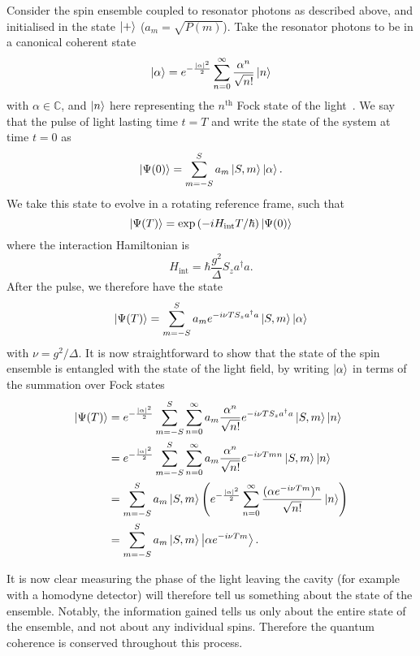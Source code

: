 Consider the spin ensemble coupled to resonator photons as described above, and
initialised in the state $\ket{+}$ ($a_m = \sqrt{P(m)}$). Take the resonator
photons to be in a canonical coherent state~\cite{Gazeau2009}
%
\begin{equation}
  \ket{\alpha} = e^{-\frac{|\alpha|^2}{2}}\sum_{n=0}^\infty \frac{\alpha^n}{\sqrt{n!}} \ket{n}
\end{equation}
%
with $\alpha\in\mathbb{C}$, and $\ket{n}$ here representing the $n^\text{th}$
Fock state of the light~\cite{agarwal2012}. We say that the pulse of light lasting time
$t=T$ and  write the state of the system at time $t=0$ as
%
\begin{equation}
  \ket{\Psi(0)} = \sum_{m=-S}^S a_m \ket{S, m}\ket{\alpha}.
\end{equation}
%
We take this state to evolve in a rotating reference frame, such that
%
\begin{equation}
  \ket{\Psi(T)} = \exp\left(-iH_\text{int}T/\hbar\right)\ket{\Psi(0)}
\end{equation}
%
where the interaction Hamiltonian is
%
\begin{equation}
  H_\text{int} = \hbar \frac{g^2}{\Delta} S_z a^\dagger a.
\end{equation}
%
After the pulse, we therefore have the state
%
\begin{equation}
  \ket{\Psi(T)} = \sum_{m=-S}^S a_m e^{-i\nu T S_z
  a^\dagger a} \ket{S, m}\ket{\alpha}
\end{equation}
%
with $\nu = g^2/\Delta$. It is now straightforward to show that
the state of the spin ensemble is entangled with the state of the light field,
by writing $\ket{\alpha}$ in terms of the summation over Fock states
%
\begin{align}
  \ket{\Psi(T)} &= e^{-\frac{|\alpha|^2}{2}}\sum_{m=-S}^S \sum_{n=0}^\infty a_m
   \frac{\alpha^n}{\sqrt{n!}} e^{-i\nu T S_z a^\dagger a} \ket{S, m} \ket{n}
   \\
  &= e^{-\frac{|\alpha|^2}{2}}\sum_{m=-S}^S \sum_{n=0}^\infty a_m
  \frac{\alpha^n}{\sqrt{n!}} e^{-i\nu Tm n} \ket{S, m} \ket{n} \\
  &= \sum_{m=-S}^S a_m \ket{S, m} \left( e^{-\frac{|\alpha|^2}{2}}
  \sum_{n=0}^\infty \frac{(\alpha e^{-i\nu T m})^n}{\sqrt{n!}}\ket{n}\right)
  \\
  &= \sum_{m=-S}^S a_m \ket{S, m}\ket{\alpha e^{-i\nu T m}}.
\end{align}

It is now clear measuring the phase of the light leaving the cavity
(for example with a homodyne detector) will therefore tell us something about
the state of the ensemble. Notably, the information gained tells us only about
the entire state of the ensemble, and not about any individual spins. Therefore
the quantum coherence is conserved throughout this process.

